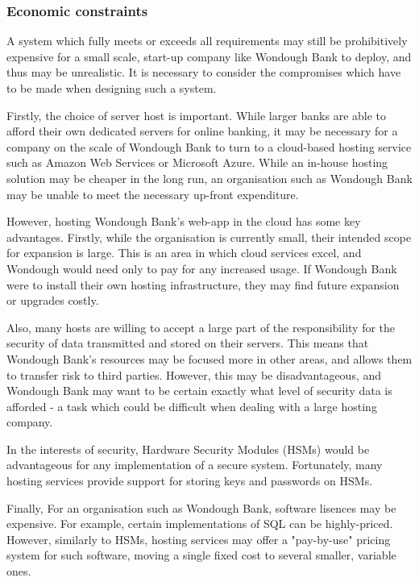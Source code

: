 \subsubsection{Economic constraints}

A system which fully meets or exceeds all requirements may still be prohibitively expensive for a small scale, start-up company like Wondough Bank to deploy, and thus may be unrealistic. It is necessary to consider the compromises which have to be made when designing such a system. 

Firstly, the choice of server host is important. While larger banks are able to afford their own dedicated servers for online banking, it may be necessary for a company on the scale of Wondough Bank to turn to a cloud-based hosting service such as Amazon Web Services or Microsoft Azure. While an in-house hosting solution may be cheaper in the long run, an organisation such as Wondough Bank may be unable to meet the necessary up-front expenditure.

However, hosting Wondough Bank's web-app in the cloud has some key advantages. Firstly, while the organisation is currently small, their intended scope for expansion is large. This is an area in which cloud services excel, and Wondough would need only to pay for any increased usage. If Wondough Bank were to install their own hosting infrastructure, they may find future expansion or upgrades costly.

Also, many hosts are willing to accept a large part of the responsibility for the security of data transmitted and stored on their servers. This means that Wondough Bank's resources may be focused more in other areas, and allows them to transfer risk to third parties. However, this may be disadvantageous, and Wondough Bank may want to be certain exactly what level of security data is afforded - a task which could be difficult when dealing with a large hosting company.

In the interests of security, Hardware Security Modules (HSMs) would be advantageous for any implementation of a secure system. Fortunately, many hosting services provide support for storing keys and passwords on HSMs.

Finally, For an organisation such as Wondough Bank, software lisences may be expensive. For example, certain implementations of SQL can be highly-priced. However, similarly to HSMs, hosting services may offer a "pay-by-use" pricing system for such software, moving a single fixed cost to several smaller, variable ones.